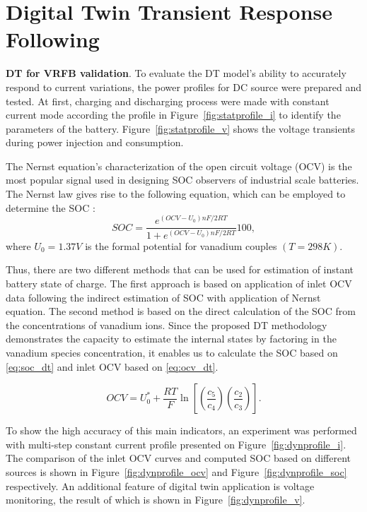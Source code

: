 \section{Digital Twin Transient Response Following}\label{sec:ch4/sec3}

\textbf{DT for VRFB validation}. To evaluate the DT model's ability to accurately respond to current variations, the power profiles for DC source were prepared and tested. At first, charging and discharging process were made with constant current mode according the profile in Figure~\cref{fig:statprofile_i} to identify the parameters of the battery. Figure~\cref{fig:statprofile_v} shows the voltage transients during power injection and consumption.

The Nernst equation's characterization of the open circuit voltage (OCV) is the most popular signal used in designing SOC observers of industrial scale batteries.  The Nernst law gives rise to the following equation, which can be employed to determine the SOC \cite{jrn_trovo_2020}:
\begin{equation}
    \label{eq:soc_ocv}
    S O C=\frac{e^{\left(O C V-U_0\right) n F / 2 R T}}{1+e^{\left(O C V-U_0\right) n F / 2 R T}}100,
\end{equation}
where $U_0 = 1.37 V$ is the formal potential for vanadium couples $(T = 298 K)$. 

Thus, there are two different methods that can be used for estimation of instant battery state of charge. The first approach is based on application of inlet OCV data following the indirect estimation of SOC with application of Nernst equation. The  second method is based on the direct calculation of the SOC from the concentrations of vanadium ions. Since the proposed DT methodology demonstrates the capacity to estimate the internal states by factoring in the vanadium species concentration, it enables us to calculate the SOC based on \cref{eq:soc_dt} and inlet OCV based on \cref{eq:ocv_dt}. 

\begin{equation}
    \label{eq:ocv_dt}
    OCV=U_0^*+\frac{R T}{F} \ln \left[\left(\frac{c_5}{c_4}\right)\left(\frac{c_2}{c_3}\right)\right].
\end{equation}

To show the high accuracy of this main indicators, an experiment was performed with multi-step constant current profile presented on Figure~\cref{fig:dynprofile_i}. The comparison of the inlet OCV curves and computed SOC based on different sources is shown in Figure~\cref{fig:dynprofile_ocv} and Figure~\cref{fig:dynprofile_soc} respectively. An additional feature of digital twin application is voltage monitoring, the result of which is shown in Figure~\cref{fig:dynprofile_v}.   

